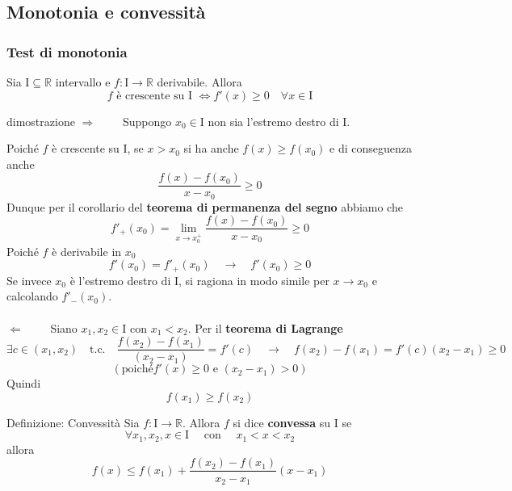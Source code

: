 \documentclass[x11names]{article}
\begin{document}
	\subsection{Monotonia e convessità}
	\begin{center}
		\colorbox{myred}{\begin{minipage}{5.75in}
				\begin{redes}{}
					\subsubsection{Test di monotonia}
					Sia $\text{I} \subseteq \mathbb{R}$ intervallo e $f: \text{I} \to \mathbb{R}$ derivabile. Allora 
					\[
					f \text{ è crescente su I } \Longleftrightarrow f'(x) \geq 0 \quad \forall x \in \text{I}
					\]
				\end{redes}
		\end{minipage}}        
	\end{center}
	\begin{es}{dimostrazione}
	$\Longrightarrow \qquad$ Suppongo $x_0 \in \text{I}$ non sia l'estremo destro di I.
	
	Poiché $f$ è crescente su I, se $x > x_0$ si ha anche $f(x) \geq f(x_0)$ e di conseguenza anche
	\[
	\frac{f(x) -f(x_0)}{x-x_0} \geq 0
	\]
	Dunque per il corollario del \textbf{teorema di permanenza del segno} abbiamo che
	\[
	f'_+(x_0) = \lim_{x \to x_0^+} \frac{f(x) -f(x_0)}{x-x_0} \geq 0
	\]
	Poiché $f$ è derivabile in $x_0$ 
	\[
	f'(x_0) = f'_+(x_0) \quad \to \quad f'(x_0) \geq 0
	\]
	Se invece $x_0$ è l'estremo destro di I, si ragiona in modo simile per $x \to x_0$ e calcolando $f'_-(x_0)$. \\ \\
	
	$\Longleftarrow \qquad$ Siano $x_1, x_2 \in \text{I}$ con $x_1 < x_2$. Per il \textbf{teorema di Lagrange}
	\[
	\exists c \in (x_1, x_2) \quad \text{t.c.} \quad  \frac{f(x_2) - f(x_1)}{(x_2-x_1)} = f'(c) \quad \to \quad f(x_2) - f(x_1) = f'(c)(x_2-x_1) \geq 0 
	\]
	\[
	(\text{poiché} f'(x) \geq 0 \text{ e } (x_2 - x_1) > 0)
	\]
	Quindi
	\[
	f(x_1) \geq f(x_2)
	\]
	\end{es}
	
		\begin{center}
		\colorbox{myblue}{\begin{minipage}{5.75in}
				\begin{blues}{Definizione: Convessità}
					Sia $f: \text{I} \to \mathbb{R}$. Allora $f$ si dice \textbf{convessa} su $\text{I}$ se 
					\[
					\forall x_1, x_2, x \in \text{I} \quad \text{ con } \quad x_1 < x < x_2
					\]
					allora
					\[
					f(x) \leq f(x_1) + \frac{f(x_2) - f(x_1)}{x_2 - x_1}(x-x_1)
					\]
				\end{blues}
		\end{minipage}}       
	\end{center}
	
\end{document}
